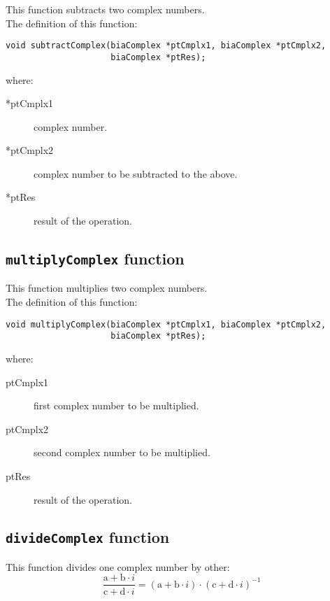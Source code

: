 This function subtracts two complex numbers.\\

The definition of this function:
%
\begin{verbatim}
void subtractComplex(biaComplex *ptCmplx1, biaComplex *ptCmplx2, 
                     biaComplex *ptRes);  
\end{verbatim}
%
where:
%
\begin{description}
\item[*ptCmplx1] complex number.
\item[*ptCmplx2] complex number to be subtracted to the above.
\item[*ptRes] result of the operation.
\end{description}

\subsection{\texttt{multiplyComplex} function}

This function multiplies two complex numbers.\\

The definition of this function:
%
\begin{verbatim}
void multiplyComplex(biaComplex *ptCmplx1, biaComplex *ptCmplx2, 
                     biaComplex *ptRes);  
\end{verbatim}
%
where:
%
\begin{description}
\item[ptCmplx1] first complex number to be multiplied. 
\item[ptCmplx2] second complex number to be multiplied.
\item[ptRes] result of the operation.
\end{description}

\subsection{\texttt{divideComplex} function}

This function divides one complex number by other:
%
\begin{displaymath}
\frac{\mathrm{a} + \mathrm{b} \cdot i}{\mathrm{c} + \mathrm{d} \cdot i} = (\mathrm{a} + \mathrm{b} \cdot i) \cdot (\mathrm{c} + \mathrm{d} \cdot i)^{-1}  
\end{displaymath}

